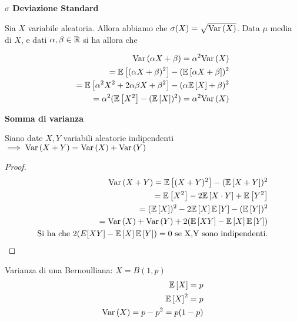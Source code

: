 \begin{defn}
    \textbf{$\sigma$ Deviazione Standard}
    
    Sia $ X $ variabile aleatoria. Allora abbiamo che $ \sigma(X) = \sqrt{\text{Var}\left(X\right)} $. Data $ \mu $ media di $ X $, e dati $ \alpha, \beta \in \mathbb{R} $ si ha allora che
    
    \begin{equation*}
        \begin{aligned}
            \text{Var}\left(\alpha X + \beta\right) = \alpha ^2 \text{Var}\left(X\right) \\
            = \mathbb{E}\left[(\alpha X + \beta)^2\right] - (\mathbb{E}\left[\alpha X + \beta\right])^2 \\
            = \mathbb{E}\left[\alpha^2 X^2 + 2 \alpha \beta X + \beta^2\right] - (\alpha \mathbb{E}\left[X\right] + \beta)^2 \\
            = \alpha^2 (\mathbb{E}\left[X^2\right] - (\mathbb{E}\left[X\right])^2) = \alpha^2 \text{Var}\left(X\right)
        \end{aligned}
    \end{equation*}
\end{defn}


\begin{defn}
    \textbf{Somma di varianza} 
    
    Siano date $ X,Y $ variabili aleatorie indipendenti $ \implies \text{Var}\left(X + Y\right) = \text{Var}\left(X\right) + \text{Var}\left(Y\right) $ 
    
    \begin{proof}
        \begin{equation*}
        \begin{aligned}
        \text{Var}\left(X+Y\right) = \mathbb{E}\left[(X+Y)^2\right] - (\mathbb{E}\left[X+Y\right])^2 \\
        = \mathbb{E}\left[X^2\right] - 2\mathbb{E}\left[X \cdot Y\right] + \mathbb{E}\left[Y^2\right] \\ 
        = (\mathbb{E}\left[X\right])^2 - 2\mathbb{E}\left[X\right]\mathbb{E}\left[Y\right] - (\mathbb{E}\left[Y\right])^2 \\
        = \text{Var}\left(X\right) + \text{Var}\left(Y\right) + 2(\mathbb{E}\left[XY\right] - \mathbb{E}\left[X\right]\mathbb{E}\left[Y\right])\\
        \text{Si ha che } 2(E[XY] - \mathbb{E}\left[X\right]\mathbb{E}\left[Y\right]) = 0 \text{ se X,Y sono indipendenti.}
        \end{aligned}
        \end{equation*}
    \end{proof}
    
\end{defn}


\begin{defn}
    Varianza di una Bernoulliana: $ X = B(1,p) $
    \begin{equation*}
    \begin{aligned}
        \mathbb{E}\left[X\right] = p \\
        \mathbb{E}\left[X\right]^2 = p \\
        \text{Var}\left(X\right) = p-p^2 = p(1-p)
    \end{aligned}
    \end{equation*}
\end{defn}

